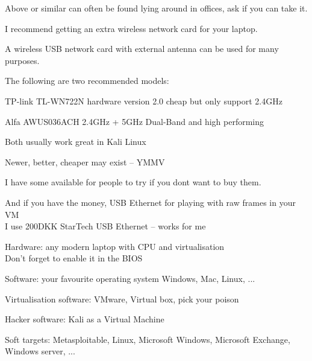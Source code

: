 \documentclass[Screen16to9,17pt]{foils}
\begin{document}
Above or similar can often be found lying around in offices, ask if you can take it.



I recommend getting an extra wireless network card for your laptop.

A wireless USB network card with external antenna can be used for many purposes.

\begin{list2}
\item The following are two recommended models:
\item TP-link TL-WN722N hardware version 2.0 cheap but only support 2.4GHz
\item Alfa AWUS036ACH 2.4GHz + 5GHz Dual-Band and high performing
\item Both usually work great in Kali Linux
\item Newer, better, cheaper may exist -- YMMV
\end{list2}

I have some available for people to try if you dont want to buy them.

And if you have the money, USB Ethernet for playing with raw frames in your VM\\
I use 200DKK StarTech USB Ethernet -- works for me




\begin{list2}
\item Hardware: any modern laptop with CPU and virtualisation\\
Don't forget to enable it in the BIOS
\item Software: your favourite operating system Windows, Mac, Linux, ...
\item Virtualisation software: VMware, Virtual box, pick your poison
\item Hacker software: Kali as a Virtual Machine 
\item Soft targets: Metasploitable, Linux, Microsoft Windows, Microsoft Exchange, Windows server, ...
\end{list2}
\end{document}

